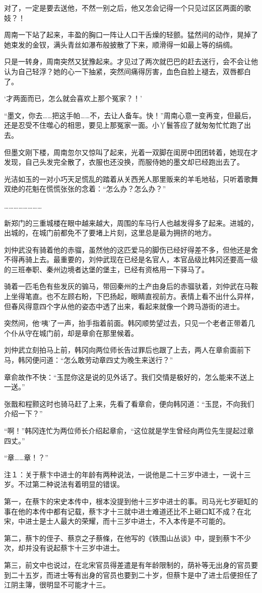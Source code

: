 对了，一定是要去送他，不然一别之后，他又怎会记得一个只见过区区两面的歌妓？！

周南一下站了起来，丰盈的胸口一阵让人口干舌燥的轻颤。猛然间的动作，晃掉了她束发的金钗，满头青丝如瀑布般披散了下来，顺滑得一如最上等的绢绸。

只是一转身，周南突然又犹豫起来。才见过了两次就巴巴的赶去送行，会不会让他认为自己轻浮？她的心一下抽紧，突然间痛得厉害，血色自脸上褪去，双唇都白了。

‘才两面而已，怎么就会喜欢上那个冤家？！’

“墨文，你去……把这手帕……不，去让人备车。快！”周南心意一变再变，但最后，还是忍受不住噬心的相思，要见上那冤家一面。小丫鬟答应了就匆匆忙忙跑了出去。

但墨文刚下楼，周南忽尔又惊叫了起来，光着一双脚在闺房中团团转着，她现在才发现，自己头发完全散了，衣服也还没换，而服侍她的墨文却已经跑出去了。

光洁如玉的一对小巧天足慌乱的踏着从关西羌人那里贩来的羊毛地毡，只听着歌舞双绝的花魁在慌慌张张的念着：“怎么办？怎么办？”

……………………

新郑门的三重城楼在眼中越来越大，周围的车马行人也越发得多了起来。进城的，出城的，在城门前都免不了要堵上片刻，这里总是最为拥挤的地方。

刘仲武没有骑着他的赤骝，虽然他的这匹爱马的脚伤已经好得差不多，但他还是舍不得再骑上去。最重要的，刘仲武现在已经是名官人，本官品级比韩冈还要高一级的三班奉职、秦州边境者达堡的堡主，已经有资格用一下驿马了。

骑着一匹毛色有些发灰的骟马，带回秦州的土产由身后的赤骝驮着，刘仲武在马鞍上坐得笔直。也不左顾右盼，下巴扬起，眼睛直视前方。表情上看不出什么异样，但春风得意四个字从他的姿态中透了出来，看起来就像一个跨马游街的进士。

突然间，他‘咦’了一声，抬手指着前面。韩冈顺势望过去，只见一个老者正带着几个仆从守在城门前，却是章俞在那里候着。

刘仲武立刻拍马上前，韩冈向两位师长告过罪后也跟了上去，两人在章俞面前下马，韩冈便问道：“怎么敢劳动章四丈为晚生来送行？”

章俞故作不快：“玉昆你这是说的见外话了。我们交情是极好的，怎么能来不送上一送。”

张戬和程颢这时也骑马赶了上来，先看了看章俞，便向韩冈道：“玉昆，不向我们介绍一下？”

“啊！”韩冈连忙为两位师长介绍起章俞，“这位就是学生曾经向两位先生提起过章四丈。”

“章……章！？”

注１：关于蔡卞中进士的年龄有两种说法，一说他是二十三岁中进士，一说十三岁。不过第二种说法有着明显的错误。

第一，在蔡卞的宋史本传中，根本没提到他十三岁中进士的事。司马光七岁砸缸的事在他的本传中都有记载，蔡卞才十三就中进士难道还比不上砸口缸不成？在北宋，中进士是士人最大的荣耀，而十三岁中进士，不入本传是不可能的。

第二，蔡卞的侄子、蔡京之子蔡條，在他写的《铁围山丛谈》中，提到蔡卞不少次，却并没有说起蔡卞十三岁中进士。

第三，前文中也说过，在北宋官员得差遣是有年龄限制的，荫补等无出身的官员要到二十五岁，而进士等有出身的官员也要到二十岁，但蔡卞是中了进士后便担任了江阴主簿，很明显不可能才十三。

